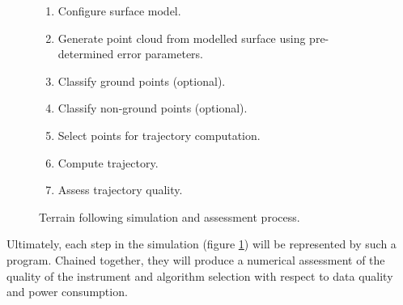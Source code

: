 \documentclass[10pt]{article}
\begin{document}
\begin{figure}
\begin{enumerate}
\item Configure surface model.
\item Generate point cloud from modelled surface using pre-determined error parameters.
\item Classify ground points (optional).
\item Classify non-ground points (optional).
\item Select points for trajectory computation.
\item Compute trajectory.
\item Assess trajectory quality.
\end{enumerate}
\caption{Terrain following simulation and assessment process.}
\label{fig:traj_sim}
\end{figure}

Ultimately, each step in the simulation (figure \ref{fig:traj_sim}) will be represented by such a program. Chained together, they will produce a numerical assessment of the quality of the instrument and algorithm selection with respect to data quality and power consumption.




\end{document}
